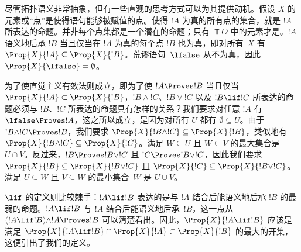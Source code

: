 \documentclass[../../../include/open-logic-section]{subfiles}
\begin{document}
尽管拓扑语义非常抽象，但有一些直观的思考方式可以为其提供动机。假设 $X$ 的元素或“点”是使得语句能够被赋值的点。使得 $!A$ 为真的所有点的集合，就是 $!A$ 所表达的命题。并非每个点集都是一个潜在的命题；只有 $\Top{O}$ 中的元素才是。$!A$ 语义地后承 $!B$ 当且仅当在 $!A$ 为真的每个点 $!B$ 也为真，即对所有~$X$ 有 $\Prop{X}{!A}
\subseteq \Prop{X}{!B}$。荒谬语句~$\lfalse$ 从不为真，因此 $\Prop{X}{\lfalse} = \emptyset$。

为了使直觉主义有效法则成立，即为了使 $!A \Proves !B$ 当且仅当 $\Prop{X}{!A} \subset \Prop{X}{!B}$，$!B \land !C$、$!B \lor !C$ 以及 $!B \lif !C$ 所表达的命题必须与 $!B$、$!C$ 所表达的命题具有怎样的关系？我们要求对任意 $!A$ 有 $\lfalse \Proves !A$，这之所以成立，是因为对所有 $U$ 都有 $\emptyset \subseteq U$。由于 $!B \land !C \Proves !B$，我们要求 $\Prop{X}{!B \land !C} \subseteq \Prop{X}{!B}$，类似地有 $\Prop{X}{!B \land !C} \subseteq \Prop{X}{!C}$。满足 $W \subseteq U$ 且 $W \subseteq V$ 的最大集合是 $U \cap V$。反过来，$!B \Proves !B \lor !C$ 且 $!C \Proves !B \lor !C$，因此我们要求 $\Prop{X}{!B} \subseteq \Prop{X}{!B \lor !C}$ 且 $\Prop{X}{!C} \subseteq \Prop{X}{!B \lor !C}$。满足 $U \subseteq W$ 且 $V \subseteq W$ 的最小集合~$W$ 是 $U \cup V$。

$\lif$ 的定义则比较棘手：$!A \lif !B$ 表达的是与 $!A$ 结合后能语义地后承 $!B$ 的最弱的命题。$!A \lif !B$ 与 $!A$ 结合后能语义地后承~$!B$，这一点从 $(!A \lif !B)
\land !A \Proves !B $ 可以清楚看出。因此，$\Prop{X}{!A \lif !B}$ 应该是满足 $\Prop{X}{!A \lif !B} \cap \Prop{X}{!A}
\subset \Prop{X}{!B}$ 的最大的开集，这便引出了我们的定义。
\end{document}
